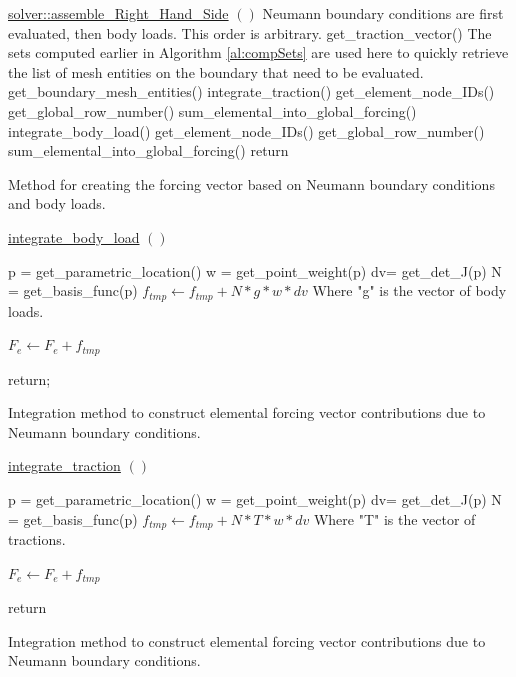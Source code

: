 \documentclass[a4paper, 12pt]{article}
\begin{document}
\vspace{\baselineskip}
\begin{algorithm}[H]
  \underline{solver::assemble\_Right\_Hand\_Side} $()$
  \BlankLine
  \tcc
  {
    Neumann boundary conditions are first evaluated,
    then body loads. This order is arbitrary.
  }
  {
    get\_traction\_vector()\;
    \tcc
    {
      The sets computed earlier in Algorithm \ref{al:compSets}
      are used here to quickly
      retrieve the list of mesh entities on the boundary
      that need to be evaluated.
    }
    get\_boundary\_mesh\_entities()\;
    {
      integrate\_traction()\;
      get\_element\_node\_IDs()\;
      {
        get\_global\_row\_number()\;
        sum\_elemental\_into\_global\_forcing()\;
      }
    }
  }
  {
    integrate\_body\_load()\;
    get\_element\_node\_IDs()\;
    {
      get\_global\_row\_number()\;
      sum\_elemental\_into\_global\_forcing()\;
    }
  }
  return\;
  \caption{Method for creating the forcing vector based on Neumann boundary
            conditions and body loads.}
  \label{al:AssembleRHS}
\end{algorithm}

\vspace{\baselineskip}
\begin{algorithm}
  \underline{integrate\_body\_load} $()$
  \BlankLine
  {
    p = get\_parametric\_location()\;
    w = get\_point\_weight(p)\;
    dv= get\_det\_J(p)\;
    N = get\_basis\_func(p)\;
    {
      {
        $f_{tmp} \leftarrow f_{tmp} + N * g * w * dv$ \;
        \tcc
        {
          Where "g" is the vector of body loads.
        }
      }
    }

    $F_e \leftarrow F_e + f_{tmp}$\;
  }
  return;
  \caption{Integration method to construct elemental forcing vector
            contributions due to Neumann boundary conditions.}
  \label{al:BLC_int}
\end{algorithm}

\vspace{\baselineskip}
\begin{algorithm}
  \underline{integrate\_traction} $()$
  \BlankLine
  {
    p = get\_parametric\_location()\;
    w = get\_point\_weight(p)\;
    dv= get\_det\_J(p)\;
    N = get\_basis\_func(p)\;
    {
      {
        $f_{tmp} \leftarrow f_{tmp} + N * T * w * dv$ \;
        \tcc
        {
          Where "T" is the vector of tractions.
        }
      }
    }

    $F_e \leftarrow F_e + f_{tmp}$\;
  }
  return\;
  \caption{Integration method to construct elemental forcing vector
            contributions due to Neumann boundary conditions.}
  \label{al:NBC_int}
\end{algorithm}
\end{document}
